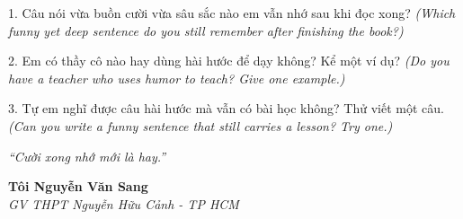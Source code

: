 \begin{tuhocnhanh}
1. Câu nói vừa buồn cười vừa sâu sắc nào em vẫn nhớ sau khi đọc xong? \textit{(Which funny yet deep sentence do you still remember after finishing the book?)}

2. Em có thầy cô nào hay dùng hài hước để dạy không? Kể một ví dụ? \textit{(Do you have a teacher who uses humor to teach? Give one example.)}

3. Tự em nghĩ được câu hài hước mà vẫn có bài học không? Thử viết một câu. \textit{(Can you write a funny sentence that still carries a lesson? Try one.)}
\end{tuhocnhanh}

\begin{center}
\textit{\color{teal}``Cười xong nhớ mới là hay.''}
\end{center}

\begin{flushright}
\textbf{Tôi Nguyễn Văn Sang}\\
\textit{GV THPT Nguyễn Hữu Cảnh - TP HCM}
\end{flushright}

\ngancach
